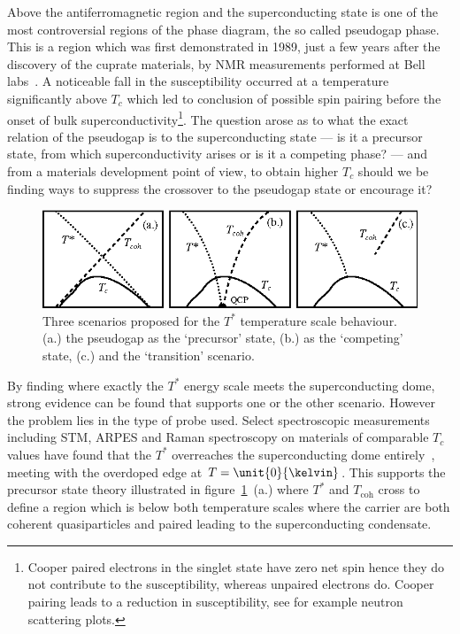 Above the antiferromagnetic region and the superconducting state is one of the most controversial regions of the phase diagram, the so called pseudogap phase. This is a region which was first demonstrated in 1989, just a few years after the discovery of the cuprate materials, by \ac{NMR} measurements performed at Bell labs~\cite{Warren1989}. A noticeable fall in the susceptibility occurred at a temperature significantly above $T_c$ which led to conclusion of possible spin pairing before the onset of bulk superconductivity\footnote{Cooper paired electrons in the singlet state have zero net spin hence they do not contribute to the susceptibility, whereas unpaired electrons do. Cooper pairing leads to a reduction in susceptibility, see for example neutron scattering plots.}. The question arose as to what the exact relation of the pseudogap is to the superconducting state --- is it a precursor state, from which superconductivity arises or is it a competing phase? --- and from a materials development point of view, to obtain higher $T_c$ should we be finding ways to suppress the crossover to the pseudogap state or encourage it?
\begin{figure}[htbp]
    \begin{center}
        \includegraphics[scale=1.0]{Chapter-Introduction/Figures/PGScenarios/PGScenarios}
        \caption{Three scenarios proposed for the $T^*$ temperature scale behaviour. (a.) the pseudogap as the `precursor' state, (b.) as the `competing' state, (c.) and the `transition' scenario.}
        \label{Fig:Intro:PGScenario}
    \end{center}
\end{figure}
By finding where exactly the $T^*$ energy scale meets the superconducting dome, strong evidence can be found that supports one or the other scenario. However the problem lies in the type of probe used. Select spectroscopic measurements including \ac{STM}, \ac{ARPES} and Raman spectroscopy on materials of comparable $T_c$ values have found that the $T^*$ overreaches the superconducting dome entirely~\cite{Hufner2008}, meeting with the overdoped edge at $T=\unit{0}{\kelvin}$. This supports the precursor state theory illustrated in figure~\ref{Fig:Intro:PGScenario}~(a.) where $T^*$ and $T_{\textrm{coh}}$ cross to define a region which is below both temperature scales where the carrier are both coherent quasiparticles and paired leading to the superconducting condensate.

